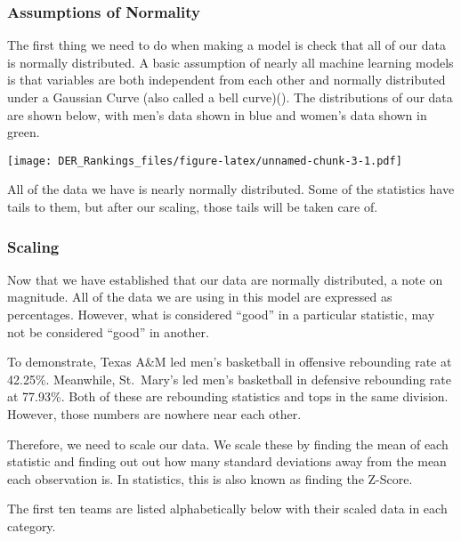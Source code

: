 \documentclass[
]{article}
\begin{document}
\subsubsection{Assumptions of Normality}\label{assumptions-of-normality}

The first thing we need to do when making a model is check that all of
our data is normally distributed. A basic assumption of nearly all
machine learning models is that variables are both independent from each
other and normally distributed under a Gaussian Curve (also called a
bell curve)(). The
distributions of our data are shown below, with men's data shown in blue
and women's data shown in green.

\texttt{[image: DER\_Rankings\_files/figure-latex/unnamed-chunk-3-1.pdf]}

All of the data we have is nearly normally distributed. Some of the
statistics have tails to them, but after our scaling, those tails will
be taken care of.

\subsubsection{Scaling}\label{scaling}

Now that we have established that our data are normally distributed, a
note on magnitude. All of the data we are using in this model are
expressed as percentages. However, what is considered ``good'' in a
particular statistic, may not be considered ``good'' in another.

To demonstrate, Texas A\&M led men's basketball in offensive rebounding
rate at 42.25\%. Meanwhile, St.~Mary's led men's basketball in defensive
rebounding rate at 77.93\%. Both of these are rebounding statistics and
tops in the same division. However, those numbers are nowhere near each
other.

Therefore, we need to scale our data. We scale these by finding the mean
of each statistic and finding out out how many standard deviations away
from the mean each observation is. In statistics, this is also known as
finding the Z-Score.

The first ten teams are listed alphabetically below with their scaled
data in each category.
\end{document}
